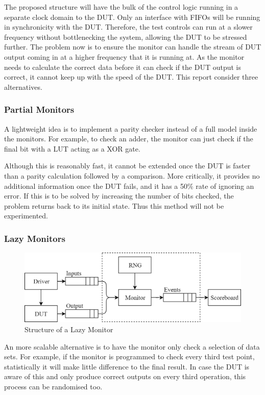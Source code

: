 The proposed structure will have the bulk of the control logic running in a separate clock domain to the DUT.
Only an interface with FIFOs will be running in synchronicity with the DUT.
Therefore, the test controls can run at a slower frequency without bottlenecking the system, allowing the DUT to be stressed further.
The problem now is to ensure the monitor can handle the stream of DUT output coming in at a higher frequency that it is running at.
As the monitor needs to calculate the correct data before it can check if the DUT output is correct, it cannot keep up with the speed of the DUT.
This report consider three alternatives.

\subsubsection{Partial Monitors}
A lightweight idea is to implement a parity checker instead of a full model inside the monitors.
For example, to check an adder, the monitor can just check if the final bit with a LUT acting as a XOR gate.

Although this is reasonably fast, it cannot be extended once the DUT is faster than a parity calculation followed by a comparison.
More critically, it provides no additional information once the DUT fails, and it has a 50\% rate of ignoring an error.
If this is to be solved by increasing the number of bits checked, the problem returns back to its initial state.
Thus this method will not be experimented.

\subsubsection{Lazy Monitors}

\begin{figure}[H]
  \centering
  \includegraphics[width=12cm]{img/LazMon}
  \caption{Structure of a Lazy Monitor}
  \label{LazMon}
\end{figure}

An more scalable alternative is to have the monitor only check a selection of data sets.
For example, if the monitor is programmed to check every third test point, statistically it will make little difference to the final result.
In case the DUT is aware of this and only produce correct outputs on every third operation, this process can be randomised too.

